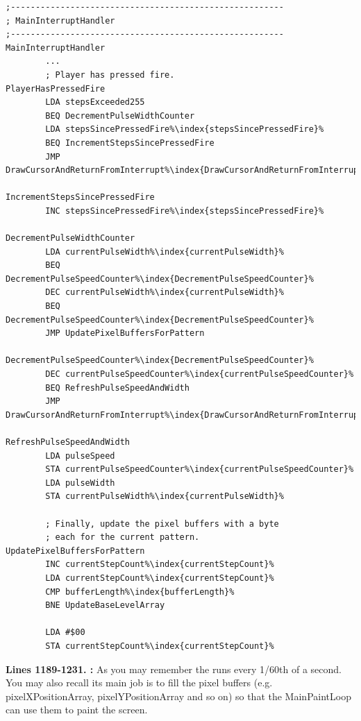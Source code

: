\clearpage

\clearpage
\begin{lstlisting}[caption=From \icode{MainInterruptHandler}.,escapechar=\%]
;-------------------------------------------------------
; MainInterruptHandler
;-------------------------------------------------------
MainInterruptHandler
        ...
        ; Player has pressed fire.
PlayerHasPressedFire   
        LDA stepsExceeded255
        BEQ DecrementPulseWidthCounter
        LDA stepsSincePressedFire%\index{stepsSincePressedFire}%
        BEQ IncrementStepsSincePressedFire
        JMP DrawCursorAndReturnFromInterrupt%\index{DrawCursorAndReturnFromInterrupt}%

IncrementStepsSincePressedFire   
        INC stepsSincePressedFire%\index{stepsSincePressedFire}%

DecrementPulseWidthCounter   
        LDA currentPulseWidth%\index{currentPulseWidth}%
        BEQ DecrementPulseSpeedCounter%\index{DecrementPulseSpeedCounter}%
        DEC currentPulseWidth%\index{currentPulseWidth}%
        BEQ DecrementPulseSpeedCounter%\index{DecrementPulseSpeedCounter}%
        JMP UpdatePixelBuffersForPattern

DecrementPulseSpeedCounter%\index{DecrementPulseSpeedCounter}%   
        DEC currentPulseSpeedCounter%\index{currentPulseSpeedCounter}%
        BEQ RefreshPulseSpeedAndWidth
        JMP DrawCursorAndReturnFromInterrupt%\index{DrawCursorAndReturnFromInterrupt}%

RefreshPulseSpeedAndWidth   
        LDA pulseSpeed
        STA currentPulseSpeedCounter%\index{currentPulseSpeedCounter}%
        LDA pulseWidth
        STA currentPulseWidth%\index{currentPulseWidth}%

        ; Finally, update the pixel buffers with a byte
        ; each for the current pattern.        
UpdatePixelBuffersForPattern    
        INC currentStepCount%\index{currentStepCount}%
        LDA currentStepCount%\index{currentStepCount}%
        CMP bufferLength%\index{bufferLength}%
        BNE UpdateBaseLevelArray

        LDA #$00
        STA currentStepCount%\index{currentStepCount}%
\end{lstlisting}
\clearpage

\textbf{Lines 1189-1231. :} 
As you may remember the  runs every 1/60th of a
second.  You may also recall its main job is to fill the pixel buffers (e.g.
pixelXPositionArray, pixelYPositionArray and so on) so that the MainPaintLoop
can use them to paint the screen. 

